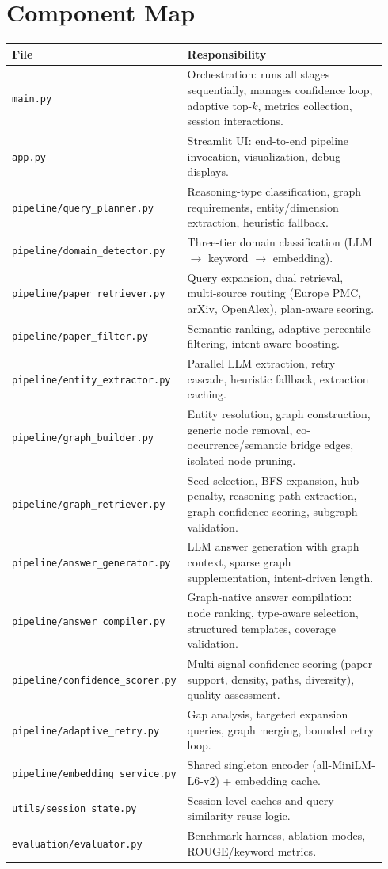 \documentclass[11pt]{article}
\begin{document}
\section{Component Map}

\begin{longtable}{p{0.30\linewidth}p{0.64\linewidth}}
\toprule
\textbf{File} & \textbf{Responsibility} \\
\midrule
\texttt{main.py} & Orchestration: runs all stages sequentially, manages confidence loop, adaptive top-$k$, metrics collection, session interactions. \\
\texttt{app.py} & Streamlit UI: end-to-end pipeline invocation, visualization, debug displays. \\
\texttt{pipeline/query\_planner.py} & Reasoning-type classification, graph requirements, entity/dimension extraction, heuristic fallback. \\
\texttt{pipeline/domain\_detector.py} & Three-tier domain classification (LLM $\rightarrow$ keyword $\rightarrow$ embedding). \\
\texttt{pipeline/paper\_retriever.py} & Query expansion, dual retrieval, multi-source routing (Europe PMC, arXiv, OpenAlex), plan-aware scoring. \\
\texttt{pipeline/paper\_filter.py} & Semantic ranking, adaptive percentile filtering, intent-aware boosting. \\
\texttt{pipeline/entity\_extractor.py} & Parallel LLM extraction, retry cascade, heuristic fallback, extraction caching. \\
\texttt{pipeline/graph\_builder.py} & Entity resolution, graph construction, generic node removal, co-occurrence/semantic bridge edges, isolated node pruning. \\
\texttt{pipeline/graph\_retriever.py} & Seed selection, BFS expansion, hub penalty, reasoning path extraction, graph confidence scoring, subgraph validation. \\
\texttt{pipeline/answer\_generator.py} & LLM answer generation with graph context, sparse graph supplementation, intent-driven length. \\
\texttt{pipeline/answer\_compiler.py} & Graph-native answer compilation: node ranking, type-aware selection, structured templates, coverage validation. \\
\texttt{pipeline/confidence\_scorer.py} & Multi-signal confidence scoring (paper support, density, paths, diversity), quality assessment. \\
\texttt{pipeline/adaptive\_retry.py} & Gap analysis, targeted expansion queries, graph merging, bounded retry loop. \\
\texttt{pipeline/embedding\_service.py} & Shared singleton encoder (all-MiniLM-L6-v2) + embedding cache. \\
\texttt{utils/session\_state.py} & Session-level caches and query similarity reuse logic. \\
\texttt{evaluation/evaluator.py} & Benchmark harness, ablation modes, ROUGE/keyword metrics. \\
\bottomrule
\end{longtable}
\end{document}
